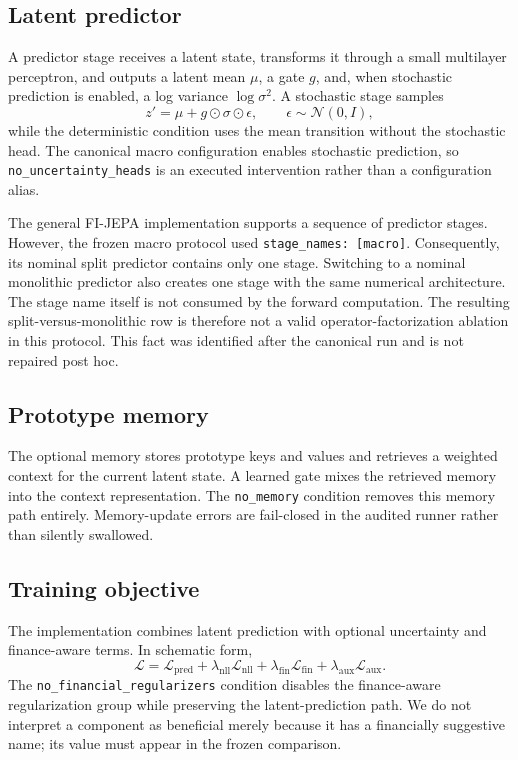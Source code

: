 \documentclass[11pt]{article}
\begin{document}
\subsection{Latent predictor}
A predictor stage receives a latent state, transforms it through a small multilayer perceptron, and outputs a latent mean $\mu$, a gate $g$, and, when stochastic prediction is enabled, a log variance $\log\sigma^2$. A stochastic stage samples
\begin{equation}
    z' = \mu + g \odot \sigma \odot \epsilon, \qquad \epsilon \sim \mathcal{N}(0,I),
\end{equation}
while the deterministic condition uses the mean transition without the stochastic head. The canonical macro configuration enables stochastic prediction, so \texttt{no\_uncertainty\_heads} is an executed intervention rather than a configuration alias.

The general FI-JEPA implementation supports a sequence of predictor stages. However, the frozen macro protocol used \texttt{stage\_names: [macro]}. Consequently, its nominal split predictor contains only one stage. Switching to a nominal monolithic predictor also creates one stage with the same numerical architecture. The stage name itself is not consumed by the forward computation. The resulting split-versus-monolithic row is therefore not a valid operator-factorization ablation in this protocol. This fact was identified after the canonical run and is not repaired post hoc.

\subsection{Prototype memory}
The optional memory stores prototype keys and values and retrieves a weighted context for the current latent state. A learned gate mixes the retrieved memory into the context representation. The \texttt{no\_memory} condition removes this memory path entirely. Memory-update errors are fail-closed in the audited runner rather than silently swallowed.

\subsection{Training objective}
The implementation combines latent prediction with optional uncertainty and finance-aware terms. In schematic form,
\begin{equation}
\mathcal{L} = \mathcal{L}_{\mathrm{pred}}
+ \lambda_{\mathrm{nll}}\mathcal{L}_{\mathrm{nll}}
+ \lambda_{\mathrm{fin}}\mathcal{L}_{\mathrm{fin}}
+ \lambda_{\mathrm{aux}}\mathcal{L}_{\mathrm{aux}}.
\end{equation}
The \texttt{no\_financial\_regularizers} condition disables the finance-aware regularization group while preserving the latent-prediction path. We do not interpret a component as beneficial merely because it has a financially suggestive name; its value must appear in the frozen comparison.
\end{document}

